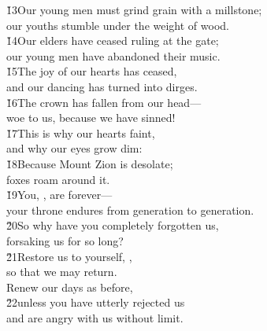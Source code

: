 \begin{poetry}
\poeml \v{13}Our young men must grind grain with a millstone; \\
\poemll    our youths stumble under the weight of wood. \\
\poeml \v{14}Our elders have ceased ruling at the gate; \\
\poemll    our young men have abandoned their music. \\
\poeml \v{15}The joy of our hearts has ceased, \\
\poemll    and our dancing has turned into dirges. \\
\poeml \v{16}The crown has fallen from our head--- \\
\poemll    woe to us, because we have sinned! \\
\poeml \v{17}This is why our hearts faint, \\
\poemll    and why our eyes grow dim: \\
\poeml \v{18}Because Mount Zion is desolate; \\
\poemll    foxes roam around it. \\
\poeml \v{19}You, , are forever--- \\
\poemll    your throne endures from generation to generation. \\
\poeml \v{20}So why have you completely forgotten us, \\
\poemll    forsaking us for so long? \\
\poeml \v{21}Restore us to yourself, , \\
\poemll    so that we may return. \\
\poeml Renew our days as before, \\
\poeml \v{22}unless you have utterly rejected us \\
\poemlll       and are angry with us without limit.\end{poetry}
